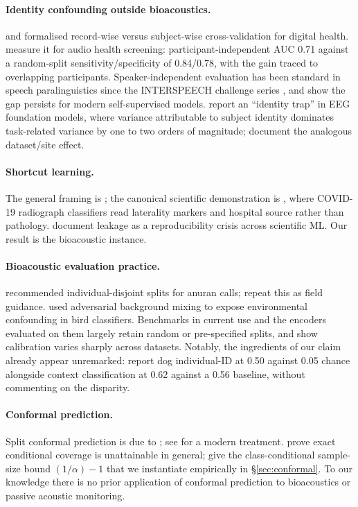 \documentclass{article}
\begin{document}
\paragraph{Identity confounding outside bioacoustics.}
\citet{saeb2017} and \citet{chaibubneto2019} formalised record-wise versus subject-wise
cross-validation for digital health. \citet{han2022} measure it for audio health screening:
participant-independent AUC 0.71 against a random-split sensitivity/specificity of 0.84/0.78, with the
gain traced to overlapping participants. Speaker-independent evaluation has been standard in speech
paralinguistics since the INTERSPEECH challenge series \citep{schuller2009,schuller2010}, and
\citet{wagner2023} show the gap persists for modern self-supervised models. \citet{lin2026} report an
``identity trap'' in EEG foundation models, where variance attributable to subject identity dominates
task-related variance by one to two orders of magnitude; \citet{zare2026} document the analogous
dataset/site effect.

\paragraph{Shortcut learning.}
The general framing is \citet{geirhos2020}; the canonical scientific demonstration is
\citet{degrave2021}, where COVID-19 radiograph classifiers read laterality markers and hospital
source rather than pathology. \citet{kapoor2023} document leakage as a reproducibility crisis across
scientific ML. Our result is the bioacoustic instance.

\paragraph{Bioacoustic evaluation practice.}
\citet{colonna2016} recommended individual-disjoint splits for anuran calls; \citet{ghani2026} repeat
this as field guidance. \citet{stowell2019} used adversarial background mixing to expose
environmental confounding in bird classifiers. Benchmarks in current use \citep{hagiwara2023beans}
and the encoders evaluated on them \citep{hagiwara2023aves,miron2026avex} largely retain random or
pre-specified splits, and \citet{schwinger2026} show calibration varies sharply across datasets.
Notably, the ingredients of our claim already appear unremarked: \citet{abzaliev2024} report dog
individual-ID at 0.50 against 0.05 chance alongside context classification at 0.62 against a 0.56
baseline, without commenting on the disparity.

\paragraph{Conformal prediction.}
Split conformal prediction is due to \citet{vovk2013}; see \citet{angelopoulos2023} for a modern
treatment. \citet{barber2021} prove exact conditional coverage is unattainable in general; \citet{ding2023} give
the class-conditional sample-size bound $(1/\alpha)-1$ that we instantiate empirically in
\S\ref{sec:conformal}. To our knowledge there is no prior application of conformal prediction to bioacoustics or passive
acoustic monitoring.
\end{document}
